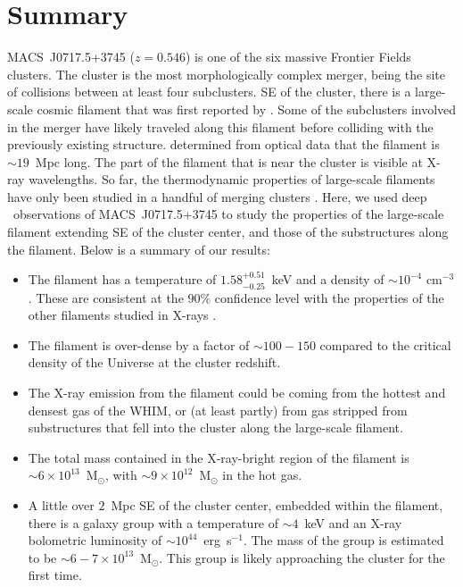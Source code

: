 \section{Summary}
\label{sec:Summary}

MACS~J0717.5+3745 ($z=0.546$) is one of the six massive Frontier Fields clusters. The cluster is the most morphologically complex merger, being the site of collisions between at least four subclusters. SE of the cluster, there is a large-scale cosmic filament that was first reported by \citet{Ebeling2004}. Some of the subclusters involved in the merger have likely traveled along this filament before colliding with the previously existing structure. \citet{Jauzac2012} determined from optical data that the filament is $\sim 19$~Mpc long. The part of the filament that is near the cluster is visible at X-ray wavelengths. So far, the thermodynamic properties of large-scale filaments have only been studied in a handful of merging clusters \citep{Werner2008, Eckert2015, Bulbul2016}. Here, we used deep \chandra\ observations of MACS~J0717.5+3745 to study the properties of the large-scale filament extending SE of the cluster center, and those of the substructures along the filament. Below is a summary of our results:

\begin{itemize}
	\item The filament has a temperature of $1.58_{-0.25}^{+0.51}$~keV and a density of $\sim 10^{-4}$ cm$^{-3}$. These are consistent at the $90\%$ confidence level with the properties of the other filaments studied in X-rays \citep{Werner2008, Eckert2015, Bulbul2016}.
	\item The filament is over-dense by a factor of $\sim 100-150$ compared to the critical density of the Universe at the cluster redshift.
	\item The X-ray emission from the filament could be coming from the hottest and densest gas of the WHIM, or (at least partly) from gas stripped from substructures that fell into the cluster along the large-scale filament.
	\item The total mass contained in the X-ray-bright region of the filament is $\sim 6\times 10^{13}$~M$_\odot$, with $\sim 9\times 10^{12}$~M$_\odot$ in the hot gas.
	\item A little over $2$~Mpc SE of the cluster center, embedded within the filament, there is a galaxy group with a temperature of $\sim 4$~keV and an X-ray bolometric luminosity of $\sim 10^{44}$~erg~s$^{-1}$. The mass of the group is estimated to be $\sim 6-7\times 10^{13}$~M$_\odot$. This group is likely approaching the cluster for the first time.
\end{itemize}

